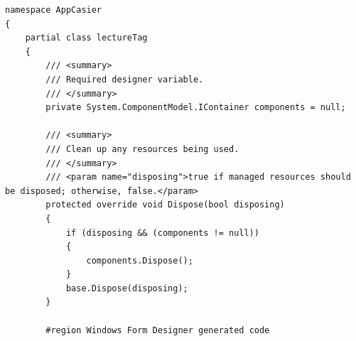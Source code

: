 \documentclass[main.tex]{subfiles}
\begin{document}
\begin{lstlisting}
namespace AppCasier
{
    partial class lectureTag
    {
        /// <summary>
        /// Required designer variable.
        /// </summary>
        private System.ComponentModel.IContainer components = null;

        /// <summary>
        /// Clean up any resources being used.
        /// </summary>
        /// <param name="disposing">true if managed resources should be disposed; otherwise, false.</param>
        protected override void Dispose(bool disposing)
        {
            if (disposing && (components != null))
            {
                components.Dispose();
            }
            base.Dispose(disposing);
        }

        #region Windows Form Designer generated code


\end{lstlisting}
\end{document}
